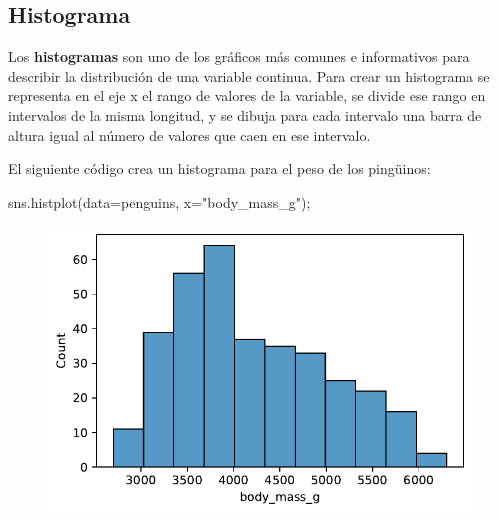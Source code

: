 \documentclass[
  a4paper,
  noprof,
  12pt,
  notoc,
  nosols,
  nobib]{mnye}
\newenvironment{Shaded}{\begin{snugshade}}{\end{snugshade}}
\newcommand{\NormalTok}[1]{\textcolor[rgb]{0.00,0.23,0.31}{#1}}
\newcommand{\OperatorTok}[1]{\textcolor[rgb]{0.37,0.37,0.37}{#1}}
\newcommand{\StringTok}[1]{\textcolor[rgb]{0.13,0.47,0.30}{#1}}
\theoremstyle{definition}
\theoremstyle{remark}
\begin{document}
\hypertarget{sec-1numerical-histogram}{%
\subsection{Histograma}\label{sec-1numerical-histogram}}

Los \textbf{histogramas} son uno de los gráficos más comunes e
informativos para describir la distribución de una variable continua.
Para crear un histograma se representa en el eje x el rango de valores
de la variable, se divide ese rango en intervalos de la misma longitud,
y se dibuja para cada intervalo una barra de altura igual al número de
valores que caen en ese intervalo.

El siguiente código crea un histograma para el peso de los pingüinos:

\begin{Shaded}
\begin{Highlighting}[]
\NormalTok{sns.histplot(data}\OperatorTok{=}\NormalTok{penguins, x}\OperatorTok{=}\StringTok{"body\_mass\_g"}\NormalTok{)}\OperatorTok{;}
\end{Highlighting}
\end{Shaded}

\begin{figure}[tbph]

{\centering \includegraphics{chapters/1numerical_files/figure-pdf/cell-5-output-1.pdf}

}

\end{figure}
\end{document}
